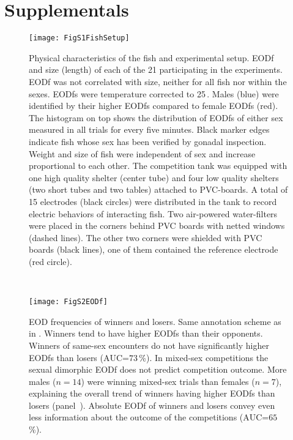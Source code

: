 %
%

\newpage
\section{Supplementals}

\renewcommand\thefigure{S\thechapter.\arabic{figure}}
\setcounter{figure}{0}   

\begin{figure}[!h]
  \centerline{\texttt{[image: FigS1FishSetup]}}
  \caption{\label{fishsetup} Physical characteristics of the fish and experimental setup.  EODf and size (length) of each of the 21 \lepto{} participating in the experiments. EODf was not correlated with size, neither for all fish nor within the sexes. EODfs were temperature corrected to 25\,\celsius. Males (blue) were identified by their higher EODfs compared to female EODfs (red). The histogram on top shows the distribution of EODfs of either sex measured in all trials for every five minutes. Black marker edges indicate fish whose sex has been verified by gonadal inspection.  Weight and size of fish were independent of sex and increase proportional to each other.  The competition tank was equipped with one high quality shelter (center tube) and four low quality shelters (two short tubes and two tables) attached to PVC-boards. A total of 15 electrodes (black circles) were distributed in the tank to record electric behaviors of interacting fish. Two air-powered water-filters were placed in the corners behind PVC boards with netted windows (dashed lines). The other two corners were shielded with PVC boards (black lines), one of them contained the reference electrode (red circle).}
\end{figure}

\begin{figure}[t]
  \begin{minipage}[t]{0.5\textwidth}\mbox{}\\[-2ex]  
    \centerline{\texttt{[image: FigS2EODf]}}
  \end{minipage}
  \hfill
  \begin{minipage}[t]{0.45\textwidth}
  \caption{\label{eodf} EOD frequencies of winners and losers. Same annotation scheme as in .  Winners tend to have higher EODfs than their opponents.  Winners of same-sex encounters do not have significantly higher EODfs than losers ($\text{AUC=73}$\,\%).  In mixed-sex competitions the sexual dimorphic EODf does not predict competition outcome. More males ($n=14$) were winning mixed-sex trials than females ($n=7$), explaining the overall trend of winners having higher EODfs than losers (panel~).  Absolute EODf of winners and losers convey even less information about the outcome of the competitions ($\text{AUC=65}$\,\%).}
  \end{minipage}
\end{figure}

